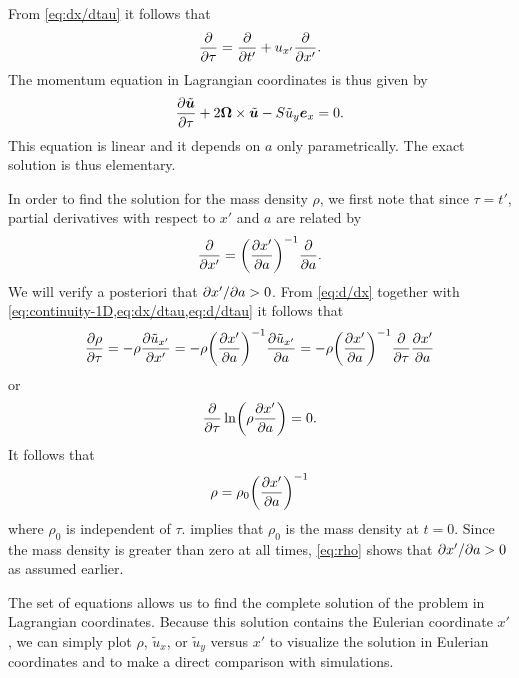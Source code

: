 \documentclass[aps,pre,notitlepage,amsmath,amssymb,amsfonts,nobibnotes,nofootinbib,superscriptaddress,onecolumn,a4paper,10pt]{revtex4-1}
\newcommand{\tvec}[1]{\tilde{\vec{#1}}}
\begin{document}
From \cref{eq:dx/dtau} it follows that
\begin{equation}
  \label{eq:d/dtau}
  \frac{\partial}{\partial\tau} = \frac{\partial}{\partial t'} + u_{x'}\frac{\partial}{\partial x'}.
\end{equation}
The momentum equation  in Lagrangian coordinates is
thus given by
\begin{equation}
  \label{eq:momentum-lagrangian}
  \pder{\tvec{u}}{\tau} + 2\vec{\Omega}\times\tvec{u} - S\tilde{u}_y\ex = 0.
\end{equation}
This equation is linear and it depends on $a$ only parametrically. The exact
solution is thus elementary.

In order to find the solution for the mass density $\rho$, we first note that
since $\tau=t'$, partial derivatives with respect to $x'$ and $a$ are related
by
\begin{equation}
  \label{eq:d/dx}
  \pder{}{x'} = \left(\pder{x'}{a}\right)^{-1}\pder{}{a}.
\end{equation}
We will verify a posteriori that $\partial{x'}/\partial{a}>0$. From \cref{eq:d/dx}
together with \cref{eq:continuity-1D,eq:dx/dtau,eq:d/dtau} it follows that
\begin{equation}
  \pder{\rho}{\tau} = -\rho\pder{\tilde{u}_{x'}}{x'} =
  -\rho\left(\pder{x'}{a}\right)^{-1}\pder{\tilde{u}_{x'}}{a} =
  -\rho\left(\pder{x'}{a}\right)^{-1}\pder{}{\tau}\pder{x'}{a}
\end{equation}
or
\begin{equation}
  \pder{}{\tau}\ln\left(\rho\pder{x'}{a}\right) = 0.
\end{equation}
It follows that
\begin{equation}
  \label{eq:rho}
  \rho = \rho_0\left(\pder{x'}{a}\right)^{-1}
\end{equation}
where $\rho_0$ is independent of $\tau$.  implies that
$\rho_0$ is the mass density at $t=0$. Since the mass density is greater than
zero at all times, \cref{eq:rho} shows that $\partial{x'}/\partial{a}>0$ as assumed
earlier.

The set of equations
 allows us to
find the complete solution of the problem in Lagrangian coordinates. Because
this solution contains the Eulerian coordinate $x'$, we can simply plot
$\rho$, $\tilde{u}_x$, or $\tilde{u}_y$ versus $x'$ to visualize the solution
in Eulerian coordinates and to make a direct comparison with simulations.


\end{document}
